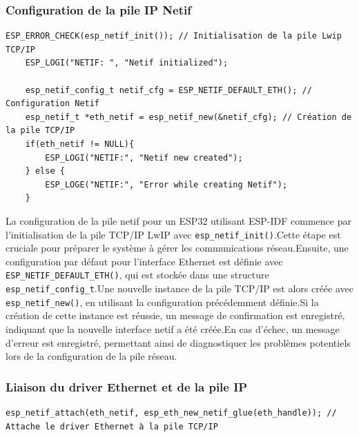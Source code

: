\documentclass[a4paper,11pt]{article}
\begin{document}
        \subsubsection{Configuration de la pile IP Netif}
        \begin{lstlisting}[style=C, caption={Configuration de la pile IP Netif}]
    ESP_ERROR_CHECK(esp_netif_init()); // Initialisation de la pile Lwip TCP/IP 
    ESP_LOGI("NETIF: ", "Netif initialized");

    esp_netif_config_t netif_cfg = ESP_NETIF_DEFAULT_ETH(); // Configuration Netif
    esp_netif_t *eth_netif = esp_netif_new(&netif_cfg); // Création de la pile TCP/IP
    if(eth_netif != NULL){
        ESP_LOGI("NETIF:", "Netif new created");
    } else {
        ESP_LOGE("NETIF:", "Error while creating Netif");
    }
        \end{lstlisting}
        \vspace{0.5cm}

        La configuration de la pile netif pour un ESP32 utilisant ESP-IDF commence par l'initialisation de la pile TCP/IP LwIP avec \texttt{esp\_netif\_init()}.\newline Cette étape est cruciale pour préparer le système à gérer les communications réseau.\newline Ensuite, une configuration par défaut pour l'interface Ethernet est définie avec \texttt{ESP\_NETIF\_DEFAULT\_ETH()}, qui est stockée dans une structure \newline \texttt{esp\_netif\_config\_t}.\newline Une nouvelle instance de la pile TCP/IP est alors créée avec \texttt{esp\_netif\_new()}, en utilisant la configuration précédemment définie.\newline Si la création de cette instance est réussie, un message de confirmation est enregistré, indiquant que la nouvelle interface netif a été créée.\newline En cas d'échec, un message d'erreur est enregistré, permettant ainsi de diagnostiquer les problèmes potentiels lors de la configuration de la pile réseau.


        \subsubsection{Liaison du driver Ethernet et de la pile IP}
        \begin{lstlisting}[style=C, caption={Liaison du driver Ethernet et de la pile IP}]
esp_netif_attach(eth_netif, esp_eth_new_netif_glue(eth_handle)); // Attache le driver Ethernet à la pile TCP/IP 
        \end{lstlisting}
\end{document}
